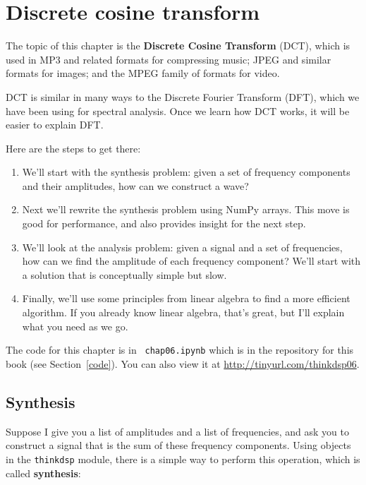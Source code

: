 \chapter{Discrete cosine transform}
\label{dct}

The topic of this chapter is the {\bf Discrete Cosine
	Transform} (DCT), which is used in MP3 and related formats for
compressing music; JPEG and similar formats for images; and the MPEG
family of formats for video.

DCT is similar in many ways to the Discrete Fourier Transform (DFT),
which we have been using for spectral analysis.
Once we learn how DCT works, it will be easier to explain DFT.

Here are the steps to get there:

\begin{enumerate}
	
	\item We'll start with the synthesis problem: given a set of frequency
	components and their amplitudes, how can we construct a wave?
	
	\item Next we'll rewrite the synthesis problem using NumPy arrays.
	This move is good for performance, and also provides insight
	for the next step.
	
	\item We'll look at the analysis problem: given a signal and a
	set of frequencies, how can we find the amplitude of each frequency
	component?  We'll start with a solution that is conceptually simple
	but slow.
	
	\item Finally, we'll use some principles from linear algebra to find a
	more efficient algorithm.  If you already know linear algebra,
	that's great, but I'll explain what you need as we go.
	
\end{enumerate}

The code for this chapter is in {\tt
	chap06.ipynb} which is in the repository for this book (see
Section~\ref{code}).
You can also view it at \url{http://tinyurl.com/thinkdsp06}.


\section{Synthesis}
\label{synth1}

Suppose I give you a list of amplitudes and a list of frequencies,
and ask you to construct a signal that is the sum of these frequency
components.  Using objects in the {\tt thinkdsp} module, there is
a simple way to perform this operation, which is called {\bf synthesis}:


